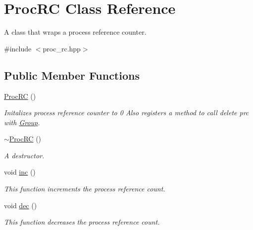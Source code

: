 \hypertarget{class_proc_r_c}{}\section{Proc\+RC Class Reference}
\label{class_proc_r_c}


A class that wraps a process reference counter.  




{\ttfamily \#include $<$proc\+\_\+rc.\+hpp$>$}

\subsection*{Public Member Functions}
\begin{DoxyCompactItemize}
\item 
\hyperlink{class_proc_r_c_aaf90e0e0b95504fda9089c6658fab53f}{Proc\+RC} ()
\begin{DoxyCompactList}\small\item\em Initalizes process reference counter to 0 Also registers a method to call delete prc with \hyperlink{struct_group}{Group}. \end{DoxyCompactList}\item 
\hyperlink{class_proc_r_c_a76d4c0e75b434d4a262cc34fc2bd7a1a}{$\sim$\+Proc\+RC} ()
\begin{DoxyCompactList}\small\item\em A destructor. \end{DoxyCompactList}\item 
void \hyperlink{class_proc_r_c_aa7512c99348dd22dd45e15b575bdd316}{inc} ()
\begin{DoxyCompactList}\small\item\em This function increments the process reference count. \end{DoxyCompactList}\item 
void \hyperlink{class_proc_r_c_adf71fc8726ffb2e26ed424331c12a99b}{dec} ()
\begin{DoxyCompactList}\small\item\em This function decreases the process reference count. \end{DoxyCompactList}\end{DoxyCompactItemize}
